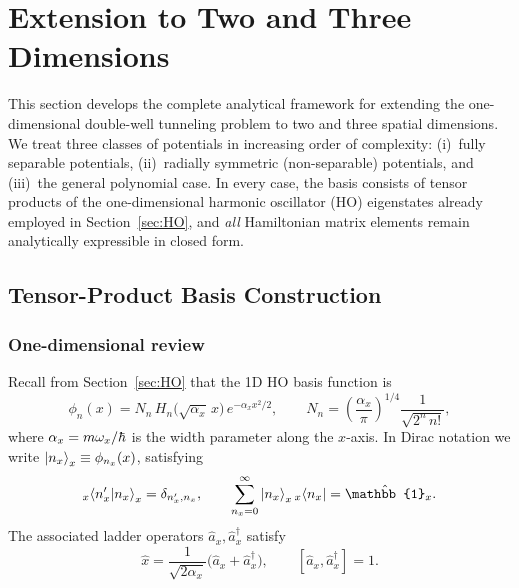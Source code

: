 \section{Extension to Two and Three Dimensions}\label{sec:multidim}

This section develops the complete analytical framework for extending the
one-dimensional double-well tunneling problem to two and three spatial
dimensions. We treat three classes of potentials in increasing order of
complexity: (i)~fully separable potentials, (ii)~radially symmetric
(non-separable) potentials, and (iii)~the general polynomial case.  In every
case, the basis consists of tensor products of the one-dimensional harmonic
oscillator (HO) eigenstates already employed in Section~\ref{sec:HO}, and
\emph{all} Hamiltonian matrix elements remain analytically expressible in
closed form.

\subsection{Tensor-Product Basis Construction}\label{sec:basis_multidim}

\subsubsection{One-dimensional review}

Recall from Section~\ref{sec:HO} that the 1D HO basis function is
\begin{equation}\label{eq:1d_basis_review}
    \phi_n(x) = N_n\, H_n\!\bigl(\sqrt{\alpha_x}\, x\bigr)\,
    e^{-\alpha_x x^2/2},
    \qquad
    N_n = \left(\frac{\alpha_x}{\pi}\right)^{\!1/4}
    \frac{1}{\sqrt{2^n\, n!}},
\end{equation}
where $\alpha_x = m\omega_x/\hbar$ is the width parameter along the $x$-axis.
In Dirac notation we write $\ket{n_x}_x \equiv \phi_{n_x}(x)$, satisfying
\begin{equation}
    {}_x\!\braket{n'_x}{n_x}_x = \delta_{n'_x, n_x},
    \qquad
    \sum_{n_x=0}^{\infty} \ket{n_x}_x {}_x\!\bra{n_x} = \hat{\mathbb{1}}_x.
\end{equation}
The associated ladder operators $\hat{a}_x,\hat{a}_x^\dagger$ satisfy
\begin{equation}\label{eq:ladder_x_md}
    \hat{x} = \frac{1}{\sqrt{2\alpha_x}}\bigl(\hat{a}_x + \hat{a}_x^\dagger\bigr),
    \qquad
    [\hat{a}_x, \hat{a}_x^\dagger] = 1.
\end{equation}


